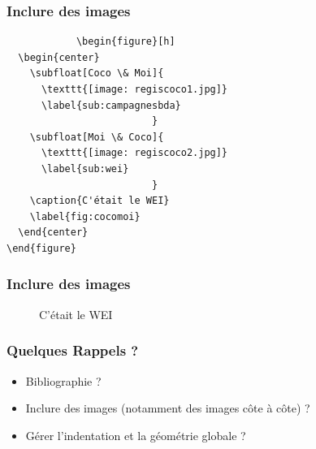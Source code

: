 \documentclass[handout]{beamer}
\begin{document}
	\begin{frame}[fragile=singleslide]
		\frametitle{Inclure des images}

		\begin{verbatim}
			\begin{figure}[h]
  \begin{center}
	\subfloat[Coco \& Moi]{
	  \texttt{[image: regiscoco1.jpg]}
	  \label{sub:campagnesbda}
						 }
	\subfloat[Moi \& Coco]{
	  \texttt{[image: regiscoco2.jpg]}
	  \label{sub:wei}
						 }
	\caption{C'était le WEI}
	\label{fig:cocomoi}
  \end{center}
\end{figure}
		\end{verbatim}

	\end{frame}

	\begin{frame}
		\frametitle{Inclure des images}

		\begin{figure}[h]
\begin{center}
\caption{C'était le WEI}
\label{fig:cocomoi}
\end{center}
\end{figure}
	\end{frame}

	\begin{frame}
		\frametitle{Quelques Rappels ?}
		\begin{itemize}
			\item Bibliographie ?
			\item Inclure des images (notamment des images côte à côte) ?
			\item Gérer l'indentation et la géométrie globale ?
		\end{itemize}
	\end{frame}
\end{document}
